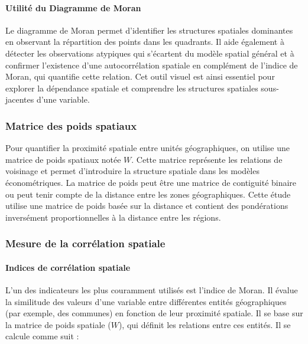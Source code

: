 \documentclass[
]{article}
\begin{document}
\paragraph{Utilité du Diagramme de
Moran}\label{utilituxe9-du-diagramme-de-moran}

Le diagramme de Moran permet d'identifier les structures spatiales
dominantes en observant la répartition des points dans les quadrants. Il
aide également à détecter les observations atypiques qui s'écartent du
modèle spatial général et à confirmer l'existence d'une autocorrélation
spatiale en complément de l'indice de Moran, qui quantifie cette
relation. Cet outil visuel est ainsi essentiel pour explorer la
dépendance spatiale et comprendre les structures spatiales sous-jacentes
d'une variable.

\subsubsection{Matrice des poids
spatiaux}\label{matrice-des-poids-spatiaux}

Pour quantifier la proximité spatiale entre unités géographiques, on
utilise une matrice de poids spatiaux notée \(W\). Cette matrice
représente les relations de voisinage et permet d'introduire la
structure spatiale dans les modèles économétriques. La matrice de poids
peut être une matrice de contiguité binaire ou peut tenir compte de la
distance entre les zones géographiques. Cette étude utilise une matrice
de poids basée sur la distance et contient des pondérations inversément
proportionnelles à la distance entre les régions.

\subsubsection{Mesure de la corrélation
spatiale}\label{mesure-de-la-corruxe9lation-spatiale}

\paragraph{Indices de corrélation
spatiale}\label{indices-de-corruxe9lation-spatiale}

L'un des indicateurs les plus couramment utilisés est l'indice de Moran.
Il évalue la similitude des valeurs d'une variable entre différentes
entités géographiques (par exemple, des communes) en fonction de leur
proximité spatiale. Il se base sur la matrice de poids spatiale (\(W\)),
qui définit les relations entre ces entités. Il se calcule comme suit :
\end{document}
